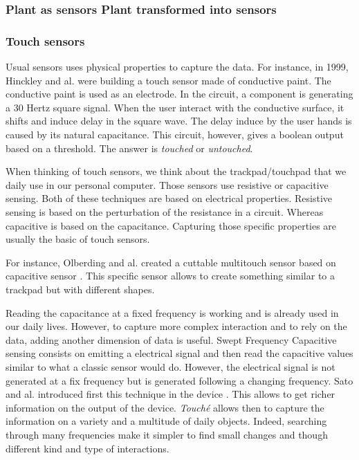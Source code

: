 \subsubsection{Plant as sensors Plant transformed into sensors}

\subsubsection{Touch sensors}

Usual sensors uses physical properties to capture the data. For instance, in 1999, Hinckley and al. \cite{hinckleyTouchsensingInputDevices1999} 
were building a touch sensor made of conductive paint. The conductive paint is used as an electrode.
In the circuit, a component is generating a 30 Hertz square signal. When the user interact with the conductive surface,
it shifts and induce delay in the square wave. The delay induce by the user hands is caused by its natural
capacitance. This circuit, however, gives a boolean output based on a threshold. The answer is \textit{touched}
or \textit{untouched}. %

When thinking of touch sensors, we think about the trackpad/touchpad that we daily use in our personal 
computer. Those sensors use resistive or capacitive sensing. Both of these techniques are based on electrical
properties. Resistive sensing is based on the perturbation of the resistance in a circuit. Whereas 
capacitive is based on the capacitance. Capturing those specific properties are usually the basic of 
touch sensors.

For instance, Olberding and al. created a cuttable multitouch sensor based on capacitive sensor \cite{olberdingCuttableMultitouchSensor2013}.
This specific sensor allows to create something similar to a trackpad but with different shapes.

Reading the capacitance at a fixed frequency is working and is already used in our daily lives. 
However, to capture more complex interaction and to rely on the data, adding another dimension of data is useful.
Swept Frequency Capacitive sensing consists on emitting a electrical signal and then read the capacitive values
similar to what a classic sensor would do. However, the electrical signal is not generated at a fix frequency
but is generated following a changing frequency. 
Sato and al. introduced first this technique in the  device \cite{satoToucheEnhancingTouch2012}.
This allows to get richer information on the output of the device. \textit{Touché} allows then to capture 
the information on a variety and a multitude of daily objects.
Indeed, searching through many frequencies make it simpler to find small changes and though different kind and type 
of interactions.

